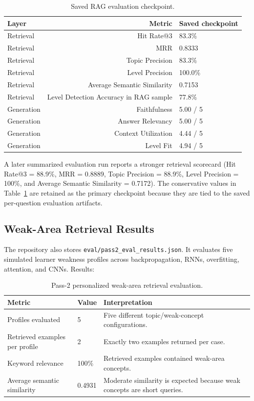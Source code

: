 \documentclass[11pt,a4paper]{article}
\begin{document}
\begin{table}[H]
\centering
\begin{tabular}{lrl}
\toprule
\textbf{Layer} & \textbf{Metric} & \textbf{Saved checkpoint} \\
\midrule
Retrieval & Hit Rate@3 & 83.3\% \\
Retrieval & MRR & 0.8333 \\
Retrieval & Topic Precision & 83.3\% \\
Retrieval & Level Precision & 100.0\% \\
Retrieval & Average Semantic Similarity & 0.7153 \\
Retrieval & Level Detection Accuracy in RAG sample & 77.8\% \\
Generation & Faithfulness & 5.00 / 5 \\
Generation & Answer Relevancy & 5.00 / 5 \\
Generation & Context Utilization & 4.44 / 5 \\
Generation & Level Fit & 4.94 / 5 \\
\bottomrule
\end{tabular}
\caption{Saved RAG evaluation checkpoint.}
\label{tab:rag-current}
\end{table}


\begin{cautionbox}
A later summarized evaluation run reports a stronger retrieval scorecard (Hit Rate@3 = 88.9\%, MRR = 0.8889, Topic Precision = 88.9\%, Level Precision = 100\%, and Average Semantic Similarity = 0.7172). The conservative values in Table~\ref{tab:rag-current} are retained as the primary checkpoint because they are tied to the saved per-question evaluation artifacts.
\end{cautionbox}

\subsection{Weak-Area Retrieval Results}

The repository also stores \texttt{eval/pass2\_eval\_results.json}. It evaluates five simulated learner weakness profiles across backpropagation, RNNs, overfitting, attention, and CNNs. Results:

\begin{table}[H]
\centering
\footnotesize
\begin{tabularx}{\textwidth}{>{\raggedright\arraybackslash}p{}p{}Y}
\toprule
\textbf{Metric} & \textbf{Value} & \textbf{Interpretation} \\
\midrule
Profiles evaluated & 5 & Five different topic/weak-concept configurations. \\
Retrieved examples per profile & 2 & Exactly two examples returned per case. \\
Keyword relevance & 100\% & Retrieved examples contained weak-area concepts. \\
Average semantic similarity & 0.4931 & Moderate similarity is expected because weak concepts are short queries. \\
\bottomrule
\end{tabularx}
\caption{Pass-2 personalized weak-area retrieval evaluation.}
\end{table}
\end{document}

